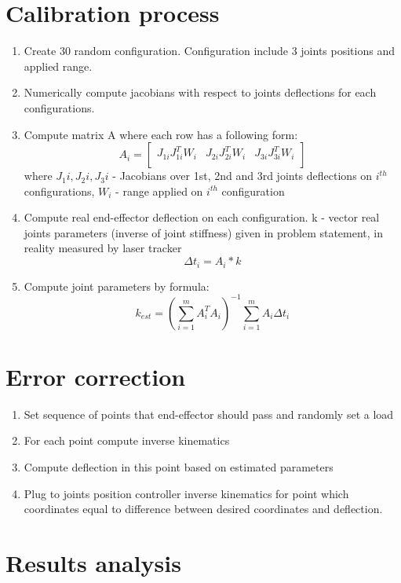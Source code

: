 \documentclass[12pt]{article}
\begin{document}
	\section{Calibration process}
	\begin{enumerate}
		\item Create 30 random configuration. Configuration include 3 joints positions and applied range.
		\item Numerically compute jacobians with respect to joints deflections for each configurations.
		\item Compute matrix A where each row has a following form: \\
		$$
			A_i = 
			\begin{bmatrix}
				J_{1i}J_{1i}^T W_i & J_{2i}J_{2i}^T W_i & J_{3i}J_{3i}^T W_i \\
			\end{bmatrix}
		$$
		where $J_1i, J_2i, J_3i$ - Jacobians over 1st, 2nd and 3rd joints deflections on $i^{th}$ configurations, $W_i$ - range applied on $i^{th}$ configuration
		\item Compute real end-effector deflection on each configuration. k - vector real joints parameters (inverse of joint stiffness) given in problem statement, in reality measured by laser tracker
		$$ \Delta t_i = A_i * k $$
		\item Compute joint parameters by formula: 
		$$
			k_{est} = (\sum_{i = 1}^{m}A_i^T A_i)^{-1}  \sum_{i = 1}^{m} A_i \Delta t_i
		$$
		
	\end{enumerate}

	\section{Error correction}
	\begin{enumerate}
		\item Set sequence of points that end-effector should pass and randomly set a load
		\item For each point compute inverse kinematics
		\item Compute deflection in this point based on estimated parameters
		\item Plug to joints position controller inverse kinematics for point which coordinates equal to difference between desired coordinates and deflection.
	\end{enumerate}

	\section{Results analysis}
\end{document}
